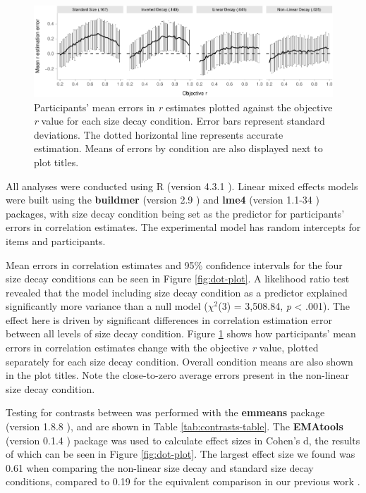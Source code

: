 \documentclass{vgtc}                          %
\begin{document}
\begin{figure}
\includegraphics[width=1\linewidth]{size_and_scatterplots_files/figure-latex/differences-plot-1} \caption{Participants' mean errors in \textit{r} estimates plotted against the objective \textit{r} value for each size decay condition. Error bars represent standard deviations. The dotted horizontal line represents accurate estimation. Means of errors by condition are also displayed next to plot titles.}\label{fig:differences-plot}
\end{figure}

All analyses were conducted using R (version 4.3.1 \cite{r_core}). Linear mixed effects models were
built using the \textbf{buildmer} (version 2.9 \cite{voeten_buildmer}) and \textbf{lme4}
(version 1.1-34 \cite{bates_lme4_2015}) packages, with size decay condition being set
as the predictor for participants' errors in correlation estimates. The experimental
model has random intercepts for items and participants.

Mean errors in correlation estimates and 95\% confidence intervals
for the four size decay conditions can be seen in Figure \ref{fig:dot-plot}.
A likelihood ratio test revealed that the model including size decay condition
as a predictor explained significantly more variance than a null model
(\(\chi^2\)(3) = 3,508.84,
\emph{p} \textless{} .001). The effect here is driven by
significant differences in correlation estimation error between all levels
of size decay condition. Figure \ref{fig:differences-plot} shows how participants' mean errors in correlation
estimates change with the objective \emph{r} value, plotted separately for each
size decay condition. Overall condition means are also shown in the plot titles.
Note the close-to-zero average errors present in the non-linear size decay condition.

Testing for contrasts between was performed with the \textbf{emmeans} package
(version 1.8.8 \cite{emmeans}), and are shown in Table \ref{tab:contrasts-table}.
The \textbf{EMAtools} (version 0.1.4 \cite{ematools}) package was used to calculate effect sizes in Cohen's d,
the results of which can be seen in Figure \ref{fig:dot-plot}.
The largest effect size we found was 0.61 when comparing
the non-linear size decay and standard size decay conditions, compared to
0.19 for the equivalent comparison in our previous work \cite{strain_2023}.
\end{document}
